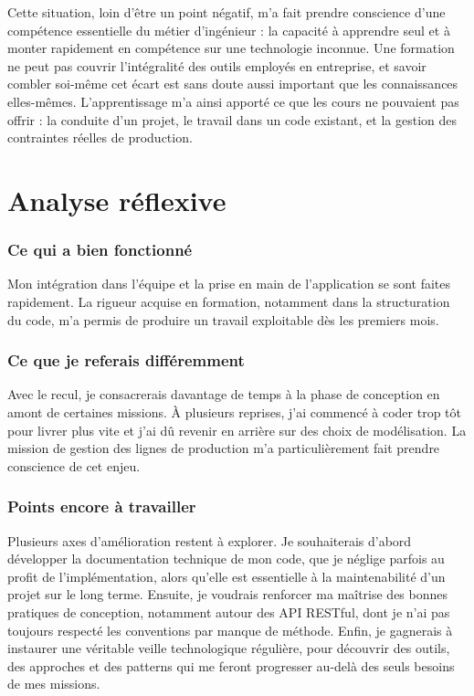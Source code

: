 \documentclass[pe1a]{tnreport} %
\begin{document}
Cette situation, loin d'être un point négatif, m'a fait prendre conscience 
d'une compétence essentielle du métier d'ingénieur : la capacité à 
apprendre seul et à monter rapidement en compétence sur une technologie 
inconnue. Une formation ne peut pas couvrir l'intégralité des outils 
employés en entreprise, et savoir combler soi-même cet écart est sans doute 
aussi important que les connaissances elles-mêmes. L'apprentissage m'a ainsi 
apporté ce que les cours ne pouvaient pas offrir : la conduite d'un projet, le travail dans un code existant, et la gestion des 
contraintes réelles de production.

\section{Analyse réflexive}

\subsubsection{Ce qui a bien fonctionné}
Mon intégration dans l'équipe et la prise en main de l'application se sont 
faites rapidement. La rigueur acquise en formation, notamment dans la 
structuration du code, m'a permis de produire un travail 
exploitable dès les premiers mois.

\subsubsection{Ce que je referais différemment}
Avec le recul, je consacrerais davantage de temps à la phase de conception 
en amont de certaines missions. À plusieurs reprises, j'ai commencé à coder 
trop tôt pour livrer plus vite et j'ai dû revenir en arrière sur des choix de modélisation. La 
mission de gestion des lignes de production m'a particulièrement fait 
prendre conscience de cet enjeu.

\subsubsection{Points encore à travailler}
Plusieurs axes d'amélioration restent à explorer. Je souhaiterais d'abord 
développer la documentation technique de mon code, que je néglige 
parfois au profit de l'implémentation, alors qu'elle est essentielle à la 
maintenabilité d'un projet sur le long terme. Ensuite, je voudrais 
renforcer ma maîtrise des bonnes pratiques de conception, 
notamment autour des API RESTful, dont je n'ai pas toujours respecté les 
conventions par manque de méthode. Enfin, je gagnerais à instaurer une 
véritable veille technologique régulière, pour découvrir des 
outils, des approches et des patterns qui me feront progresser au-delà 
des seuls besoins de mes missions.
\end{document}
